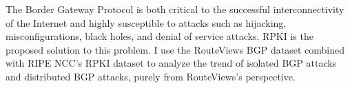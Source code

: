 The Border Gateway Protocol is both critical to the successful interconnectivity
of the Internet and highly susceptible to attacks such as hijacking,
misconfigurations, black holes, and denial of service attacks. RPKI is the
proposed solution to this problem. I use the RouteViews BGP dataset combined
with RIPE NCC's RPKI dataset to analyze the trend of isolated BGP attacks and
distributed BGP attacks, purely from RouteViews's perspective.
